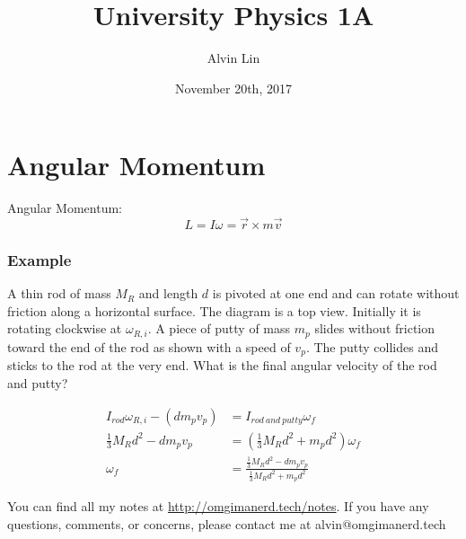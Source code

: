 \documentclass{math}
\title{University Physics 1A}
\author{Alvin Lin}
\date{November 20th, 2017}
\begin{document}
\maketitle

\section*{Angular Momentum}
Angular Momentum:
\[ L = I\omega = \vec{r}\times m\vec{v} \]

\subsubsection*{Example}
A thin rod of mass \( M_R \) and length \( d \) is pivoted at one end and can
rotate without friction along a horizontal surface. The diagram is a top view.
Initially it is rotating clockwise at \( \omega_{R,i} \). A piece of putty of
mass \( m_p \) slides without friction toward the end of the rod as shown with
a speed of \( v_p \). The putty collides and sticks to the rod at the very end.
What is the final angular velocity of the rod and putty?
\begin{center}
\end{center}
\begin{align*}
  I_{rod}\omega_{R,i}-(dm_pv_p) &= I_{rod~and~putty}\omega_f \\
  \frac{1}{3}M_Rd^2-dm_pv_p &= (\frac{1}{3}M_Rd^2+m_pd^2)\omega_f \\
  \omega_f &= \frac{\frac{1}{3}M_Rd^2-dm_pv_p}{\frac{1}{3}M_Rd^2+m_pd^2}
\end{align*}

\begin{center}
  You can find all my notes at \url{http://omgimanerd.tech/notes}. If you have
  any questions, comments, or concerns, please contact me at
  alvin@omgimanerd.tech
\end{center}
\end{document}
